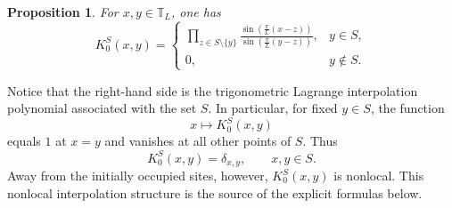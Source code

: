 \documentclass[11pt]{article}
\numberwithin{equation}{section}
\newtheorem{proposition}[theorem]{Proposition}
\newcommand{\1}{\mathbf 1}
\begin{document}
\begin{proposition}
\label{prop:mixed_correlation_deterministic}
For \(x,y\in\mathbb T_L\), one has
\begin{equation}
    K^S_0(x,y)
    =
    \begin{cases}
    \displaystyle
    \prod_{z\in S\setminus\{y\}}
    \frac{
        \sin\left(\frac{\pi}{L}(x-z)\right)
    }{
        \sin\left(\frac{\pi}{L}(y-z)\right)
    },
    & y\in S, \\[1.4em]
    0,
    & y\notin S .
    \end{cases}
    \label{eq:mixed_correlation_formula}
\end{equation}
\end{proposition}
Notice that the right-hand side is the trigonometric Lagrange interpolation
polynomial associated with the set \(S\).  In particular, for fixed \(y\in S\),
the function
\[
    x\longmapsto K^S_0(x,y)
\]
equals \(1\) at \(x=y\) and vanishes at all other points of \(S\).  Thus
\[
    K^S_0(x,y)=\delta_{x,y},
    \qquad x,y\in S.
\]
Away from the initially occupied sites, however, \(K^S_0(x,y)\) is nonlocal.  This
nonlocal interpolation structure is the source of the explicit formulas below.
\end{document}
